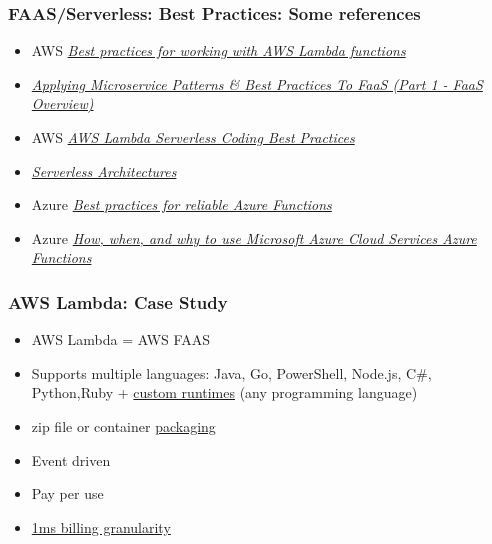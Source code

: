 \documentclass[11pt,aspectratio=169]{beamer}
\begin{document}
\begin{nrcanFrame}
  \frametitle{FAAS/Serverless: Best Practices: Some references}
  \begin{itemize}
  \item AWS \textit{\href{https://docs.aws.amazon.com/lambda/latest/dg/best-practices.html}{Best practices for working with AWS Lambda functions}}
  \item \textit{\href{https://www.captechconsulting.com/blogs/applying-microservice-patterns-best-practices-to-faas-part-1-faas-overview}{Applying Microservice Patterns \& Best Practices To FaaS (Part 1 - FaaS Overview)}}
  \item AWS \textit{\href{https://www.intentsg.com/aws-lambda-serverless-coding-best-practices/}{AWS Lambda Serverless Coding Best Practices}}
  \item
    \textit{\href{https://martinfowler.com/articles/serverless.html}{Serverless Architectures}}
  \item Azure \textit{\href{https://docs.microsoft.com/en-us/azure/azure-functions/functions-best-practices?tabs=csharp}{Best practices for reliable Azure Functions}}
  \item Azure \textit{\href{https://www.devbridge.com/articles/how-when-and-why-to-use-microsoft-azure-cloud-services/}{How, when, and why to use Microsoft Azure Cloud Services Azure Functions}}
    \end{itemize}
\end{nrcanFrame}



\begin{nrcanFrame}
  \frametitle{AWS Lambda: Case Study}
  \begin{itemize}
  \item AWS Lambda  = AWS FAAS
  \item Supports multiple languages: Java, Go, PowerShell, Node.js, C\#, Python,Ruby + \href{https://docs.aws.amazon.com/lambda/latest/dg/runtimes-custom.html}{custom runtimes} (any programming language)
  \item zip file or container \href{https://docs.aws.amazon.com/lambda/latest/dg/gettingstarted-package.html}{packaging}
  \item Event driven
  \item Pay per use
  \item \href{https://aws.amazon.com/blogs/aws/new-for-aws-lambda-1ms-billing-granularity-adds-cost-savings/}{1ms billing granularity}
  \end{itemize}
\end{nrcanFrame}
\end{document}
